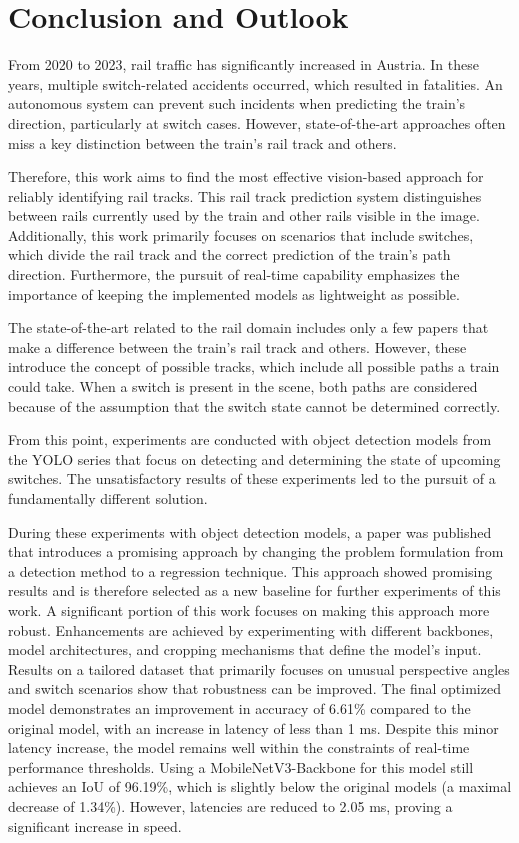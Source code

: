 \clearpage
\chapter{Conclusion and Outlook}
\label{sec:conclusionAndOutlook}

From 2020 to 2023, rail traffic has significantly increased in Austria.
In these years, multiple switch-related accidents occurred, which resulted in fatalities.
An autonomous system can prevent such incidents when predicting the train's direction, particularly at switch cases.
However, state-of-the-art approaches often miss a key distinction between the train's rail track and others.

Therefore, this work aims to find the most effective vision-based approach for reliably identifying rail tracks.
This rail track prediction system distinguishes between rails currently used by the train and other rails visible in the image.
Additionally, this work primarily focuses on scenarios that include switches, which divide the rail track and the correct prediction of the train's path direction.
Furthermore, the pursuit of real-time capability emphasizes the importance of keeping the implemented models as lightweight as possible.

The state-of-the-art related to the rail domain includes only a few papers that make a difference between the train's rail track and others.
However, these introduce the concept of possible tracks, which include all possible paths a train could take.
When a switch is present in the scene, both paths are considered because of the assumption that the switch state cannot be determined correctly.

From this point, experiments are conducted with object detection models from the \ac{YOLO} series that focus on detecting and determining the state of upcoming switches.
The unsatisfactory results of these experiments led to the pursuit of a fundamentally different solution.

During these experiments with object detection models, a paper was published that introduces a promising approach by changing the problem formulation from a detection method to a regression technique.
This approach showed promising results and is therefore selected as a new baseline for further experiments of this work.
A significant portion of this work focuses on making this approach more robust.
Enhancements are achieved by experimenting with different backbones, model architectures, and cropping mechanisms that define the model's input.
Results on a tailored dataset that primarily focuses on unusual perspective angles and switch scenarios show that robustness can be improved.
The final optimized model demonstrates an improvement in accuracy of 6.61\% compared to the original model, with an increase in latency of less than 1 ms.
Despite this minor latency increase, the model remains well within the constraints of real-time performance thresholds.
Using a MobileNetV3-Backbone for this model still achieves an \ac{IoU} of 96.19\%, which is slightly below the original models (a maximal decrease of 1.34\%).
However, latencies are reduced to 2.05 ms, proving a significant increase in speed. 

